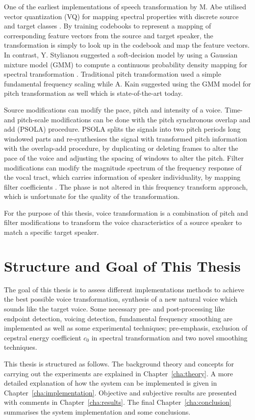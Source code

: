 One of the earliest implementations of speech transformation by M. Abe utilised vector quantization (VQ) for mapping spectral properties with discrete source and target classes \cite{abe88}. By training codebooks to represent a mapping of corresponding feature vectors from the source and target speaker, the transformation is simply to look up in the codebook and map the feature vectors. In contrast, Y. Stylianou \etal suggested a soft-decision model by using a Gaussian mixture model (GMM) to compute a continuous probability density mapping for spectral transformation \cite{stylianou98}. Traditional pitch transformation used a simple fundamental frequency scaling while A. Kain \etal suggested using the GMM model for pitch transformation as well \cite{kain00} which is state-of-the-art today.

Source modifications can modify the pace, pitch and intensity of a voice. Time- and pitch-scale modifications can be done with the pitch synchronous overlap and add (PSOLA) procedure. PSOLA splits the signals into two pitch periods long windowed parts and re-synthesises the signal with transformed pitch information with the overlap-add procedure, by duplicating or deleting frames to alter the pace of the voice and adjusting the spacing of windows to alter the pitch. Filter modifications can modify the magnitude spectrum of the frequency response of the vocal tract, which carries information of speaker individuality, by mapping filter coefficients \cite{stylianou09,nguyen09}. The phase is not altered in this frequency transform approach, which is unfortunate for the quality of the transformation.

For the purpose of this thesis, voice transformation is a combination of pitch and filter modifications to transform the voice characteristics of a source speaker to match a specific target speaker. 

\section{Structure and Goal of This Thesis} %
\label{sec:structure_and_goal_of_this_thesis}
The goal of this thesis is to assess different implementations methods to achieve the best possible voice transformation, \ie synthesis of a new natural voice which sounds like the target voice. Some necessary pre- and post-processing like endpoint detection, voicing detection, fundamental frequency smoothing are implemented as well as some experimental techniques; pre-emphasis, exclusion of cepstral energy coefficient $c_0$ in spectral transformation and two novel smoothing techniques.

This thesis is structured as follows. The background theory and concepts for carrying out the experiments are explained in Chapter~\ref{cha:theory}. A more detailed explanation of how the system can be implemented is given in Chapter~\ref{cha:implementation}. Objective and subjective results are presented with comments in Chapter~\ref{cha:results}. The final Chapter~\ref{cha:conclusion} summarises the system implementation and some conclusions.

